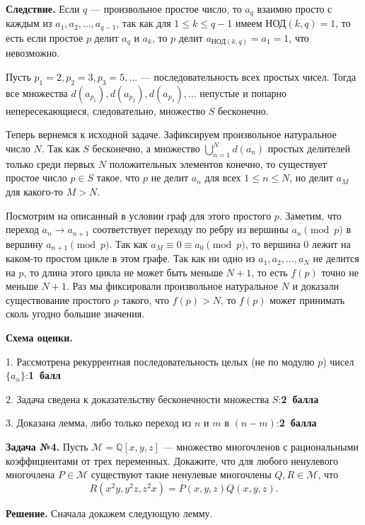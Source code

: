 \documentclass[12pt]{article}
\def\avtor#1{\linebreak[2] \hspace*{\fill}{\small (\mbox{\textit{#1})}}}
\def \Problem#1{\par \bigskip \textbf{Задача №{#1}. }}
\def \solution{\par \bigskip \textbf{Решение. }}
\def \marking{\par \bigskip \textbf{Схема оценки. }}
\def \corollary{\par \bigskip \textbf{Следствие. }}
\def\leq{\leqslant}
\begin{document}
\corollary Если $q$ --- произвольное простое число, то $a_{q}$ взаимно просто с каждым из $a_1, a_2, \ldots, a_{q - 1}$, так как для $1 \leq k \leq q - 1$ имеем $\text{НОД}(k, q) = 1$, то есть если простое $p$ делит $a_q$ и $a_k$, то $p$ делит $a_{\text{НОД}(k, q)} = a_1 = 1$, что невозможно.

\medskip

Пусть $p_1 = 2, p_2 = 3, p_3 = 5, \ldots$ --- последовательность всех простых чисел. Тогда все множества $d(a_{p_1}), d(a_{p_2}), d(a_{p_3}), \ldots$ непустые и попарно непересекающиеся, следовательно, множество $S$ бесконечно.

Теперь вернемся к исходной задаче. Зафиксируем произвольное натуральное число $N$. Так как $S$ бесконечно, а множество $\bigcup_{n = 1}^{N} d(a_{n})$ простых делителей только среди первых $N$ положительных элементов  конечно, то существует простое число $p \in S$ такое, что $p$ не делит $a_n$ для всех $1 \leq n \leq N$, но делит $a_M$ для какого-то $M > N$.

Посмотрим на описанный в условии граф для этого простого $p$. Заметим, что переход $a_n \to a_{n + 1}$ соответствует переходу по ребру из вершины $a_n \pmod{p}$ в вершину $a_{n + 1} \pmod{p}$. Так как $a_M \equiv 0 \equiv a_0 \pmod{p}$, то вершина $0$ лежит на каком-то простом цикле в этом графе. Так как ни одно из $a_1, a_2, \ldots, a_N$ не делится на $p$, то длина этого цикла не может быть меньше $N + 1$, то есть $f(p)$ точно не меньше $N + 1$. Раз мы фиксировали произвольное натуральное $N$ и доказали существование простого $p$ такого, что $f(p) > N$, то $f(p)$ может принимать сколь угодно большие значения.

\marking

1. Рассмотрена рекуррентная последовательность целых (не по модулю $p$) чисел $\{ a_n \}$:\dotfill\textbf{1~балл}

2. Задача сведена к доказательству бесконечности множества $S$:\dotfill\textbf{2~балла}

3. Доказана лемма, либо только переход из $n$ и $m$ в $(n - m)$:\dotfill\textbf{2~балла}


\Problem{4} Пусть $\mathcal{M} = \mathbb{Q}[x, y, z]$ --- множество многочленов с рациональными коэффициентами от трех переменных. Докажите, что для любого ненулевого многочлена $P \in \mathcal{M}$ существуют такие ненулевые многочлены $Q, R \in \mathcal{M}$, что
$$
R(x^2 y, y^2 z, z^2 x)
=
P(x, y, z) Q(x, y, z)
.
$$ \avtor{Navid Safaei}

\solution Сначала докажем следующую лемму.
\end{document}
